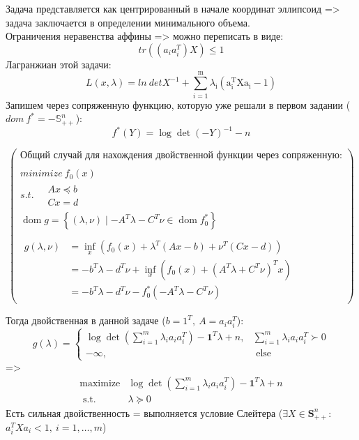 \documentclass[12pt,letterpaper]{article}
\begin{document}
Задача представляется как центрированный в начале координат эллипсоид => задача заключается в определении минимального объема.\\  
Ограничения неравенства аффины => можно переписать в виде:
$$tr((a_ia^T_i)X)\leqslant1 $$
Лагранжиан этой задачи:
$$L(x,\lambda)=ln\ detX^{-1}+\sum_{i=1}^{\mathrm{m}} \lambda_{\mathrm{i}}\left(\mathrm{a}_{\mathrm{i}}^{\mathrm{T}} \mathrm{Xa}_{\mathrm{i}}-1\right)$$
Запишем через сопряженную функцию, которую уже решали в первом задании ($dom\ f^*=-\mathbb{S}^n_{++}$):
$$f^{*}(Y)=\log \operatorname{det}(-Y)^{-1}-n $$

$$\begin{pmatrix}
\text{Общий случай для нахождения двойственной функции через сопряженную:}\\ 
\\
minimize\ f_0(x)\\ 
s.t.\ \begin{aligned} &Ax\preceq b\\ 
&Cx=d\end{aligned} \\ 
\operatorname{dom} g=\left\{(\lambda, \nu) \mid-A^{T} \lambda-C^{T} \nu \in \operatorname{dom} f^{*}_0\right\}\\
\\
\begin{aligned}
g(\lambda, \nu) &=\inf _{x}\left(f_{0}(x)+\lambda^{T}(A x-b)+\nu^{T}(C x-d)\right) \\
&=-b^{T} \lambda-d^{T} \nu+\inf _{x}\left(f_{0}(x)+\left(A^{T} \lambda+C^{T} \nu\right)^{T} x\right) \\
&=-b^{T} \lambda-d^{T} \nu-f_{0}^{*}\left(-A^{T} \lambda-C^{T} \nu\right)
\end{aligned}

\end{pmatrix}$$

Тогда двойственная в данной задаче ($b=1^T,\ A=a_ia^T_i$):
$$g(\lambda)=\left\{\begin{array}{ll}
\log \operatorname{det}\left(\sum_{i=1}^{m} \lambda_{i} a_{i} a_{i}^{T}\right)-\mathbf{1}^{T} \lambda+n, & \sum_{i=1}^{m} \lambda_{i} a_{i} a_{i}^{T} \succ 0 \\
-\infty, & \text { else }
\end{array}\right. $$
=>
$$\begin{array}{ll}
\operatorname{maximize} & \log \operatorname{det}\left(\sum_{i=1}^{m} \lambda_{i} a_{i} a_{i}^{T}\right)-\mathbf{1}^{T} \lambda+n \\
\text { s.t. } & \lambda \succeq 0
\end{array}$$
Есть сильная двойственность = выполняется условие Слейтера ($\exists X \in \mathbf{S}_{++}^{n}:$ $a_{i}^{T} X a_{i} < 1,\ i=1, \ldots, m$)
\end{document}
